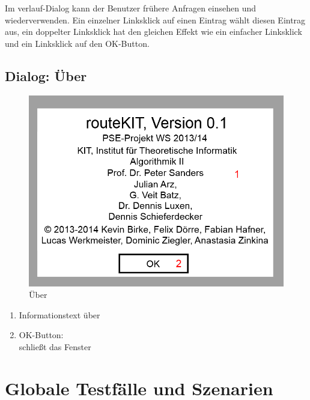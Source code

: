 \documentclass[a4paper, 11pt]{article}
\begin{document}
Im \gls{verlauf}-Dialog kann der Benutzer frühere Anfragen einsehen und wiederverwenden. Ein einzelner Linksklick auf einen Eintrag wählt diesen Eintrag aus, ein doppelter Linksklick hat den gleichen Effekt wie ein einfacher Linksklick und ein Linksklick auf den OK-Button.

\subsection{Dialog: Über}
\begin{figure}[H]
\centering
\includegraphics[width=0.7\linewidth]{mockup_screenshot_about}
\caption{Über}
\label{fig:mockupabout}
\end{figure}
\begin{enumerate}
\item Informationstext über \routeKIT
\item OK-Button:\\
schließt das Fenster
\end{enumerate}

\section{Globale Testfälle und Szenarien}
\end{document}
